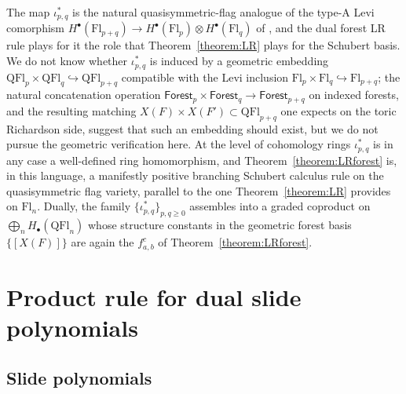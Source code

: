 \documentclass{amsart}
\theoremstyle{definition}
\theoremstyle{remark}
\numberwithin{equation}{subsection}
\newcommand{\downvar}[1]{\stackrel{#1}{\searrow}}
\newcommand{\dsch}{\ensuremath{\Xi}}
\newcommand{\code}{\mathfrak{c}}
\begin{document}
The map $\iota_{p,q}^*$ is the natural quasisymmetric-flag analogue of the type-A Levi comorphism $H^\bullet(\mathrm{Fl}_{p+q})\to H^\bullet(\mathrm{Fl}_p)\otimes H^\bullet(\mathrm{Fl}_q)$ of \cite{ressayre2009branching}, and the dual forest LR rule plays for it the role that Theorem~\ref{theorem:LR} plays for the Schubert basis. We do not know whether $\iota_{p,q}^*$ is induced by a geometric embedding $\mathrm{QFl}_p\times \mathrm{QFl}_q\hookrightarrow \mathrm{QFl}_{p+q}$ compatible with the Levi inclusion $\mathrm{Fl}_p\times \mathrm{Fl}_q\hookrightarrow \mathrm{Fl}_{p+q}$; the natural concatenation operation $\mathsf{Forest}_p\times \mathsf{Forest}_q\to \mathsf{Forest}_{p+q}$ on indexed forests, and the resulting matching $X(F)\times X(F')\subset \mathrm{QFl}_{p+q}$ one expects on the toric Richardson side, suggest that such an embedding should exist, but we do not pursue the geometric verification here. At the level of cohomology rings $\iota_{p,q}^*$ is in any case a well-defined ring homomorphism, and Theorem~\ref{theorem:LRforest} is, in this language, a manifestly positive branching Schubert calculus rule on the quasisymmetric flag variety, parallel to the one Theorem~\ref{theorem:LR} provides on $\mathrm{Fl}_n$. Dually, the family $\{\iota_{p,q}^*\}_{p,q\geq 0}$ assembles into a graded coproduct on $\bigoplus_n H_\bullet(\mathrm{QFl}_n)$ whose structure constants in the geometric forest basis $\{[X(F)]\}$ are again the $f_{a,b}^c$ of Theorem~\ref{theorem:LRforest}.



\section{Product rule for dual slide polynomials}\label{section:slide}
\subsection{Slide polynomials}
\end{document}
